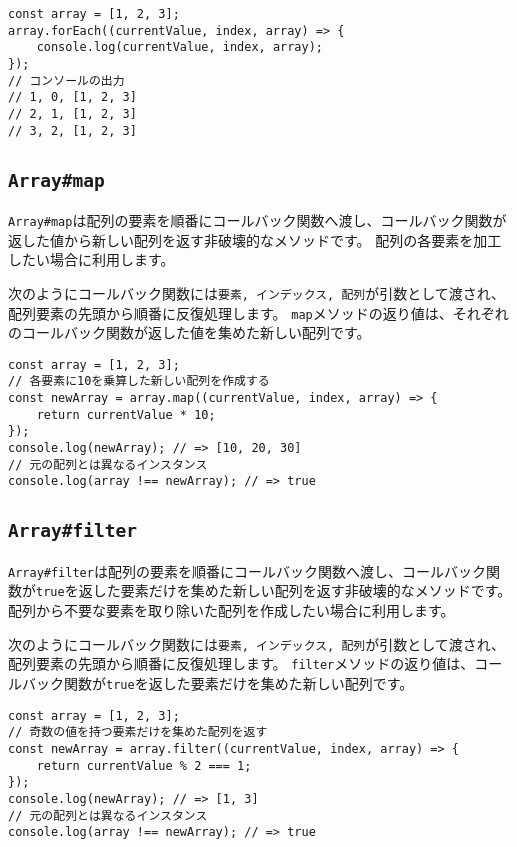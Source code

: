 \begin{lstlisting}
const array = [1, 2, 3];
array.forEach((currentValue, index, array) => {
    console.log(currentValue, index, array);
});
// コンソールの出力
// 1, 0, [1, 2, 3]
// 2, 1, [1, 2, 3]
// 3, 2, [1, 2, 3]
\end{lstlisting}

\hypertarget{array-map}{%
\subsection{\texorpdfstring{\texttt{Array\#map}}{Array\#map}}\label{array-map}}

\texttt{Array\#map}は配列の要素を順番にコールバック関数へ渡し、コールバック関数が返した値から新しい配列を返す非破壊的なメソッドです。
配列の各要素を加工したい場合に利用します。

次のようにコールバック関数には\texttt{要素, インデックス, 配列}が引数として渡され、配列要素の先頭から順番に反復処理します。
\texttt{map}メソッドの返り値は、それぞれのコールバック関数が返した値を集めた新しい配列です。

\begin{lstlisting}
const array = [1, 2, 3];
// 各要素に10を乗算した新しい配列を作成する
const newArray = array.map((currentValue, index, array) => {
    return currentValue * 10;
});
console.log(newArray); // => [10, 20, 30]
// 元の配列とは異なるインスタンス
console.log(array !== newArray); // => true
\end{lstlisting}

\hypertarget{array-filter}{%
\subsection{\texorpdfstring{\texttt{Array\#filter}}{Array\#filter}}\label{array-filter}}

\texttt{Array\#filter}は配列の要素を順番にコールバック関数へ渡し、コールバック関数が\texttt{true}を返した要素だけを集めた新しい配列を返す非破壊的なメソッドです。
配列から不要な要素を取り除いた配列を作成したい場合に利用します。

次のようにコールバック関数には\texttt{要素, インデックス, 配列}が引数として渡され、配列要素の先頭から順番に反復処理します。
\texttt{filter}メソッドの返り値は、コールバック関数が\texttt{true}を返した要素だけを集めた新しい配列です。

\begin{lstlisting}
const array = [1, 2, 3];
// 奇数の値を持つ要素だけを集めた配列を返す
const newArray = array.filter((currentValue, index, array) => {
    return currentValue % 2 === 1;
});
console.log(newArray); // => [1, 3]
// 元の配列とは異なるインスタンス
console.log(array !== newArray); // => true
\end{lstlisting}

